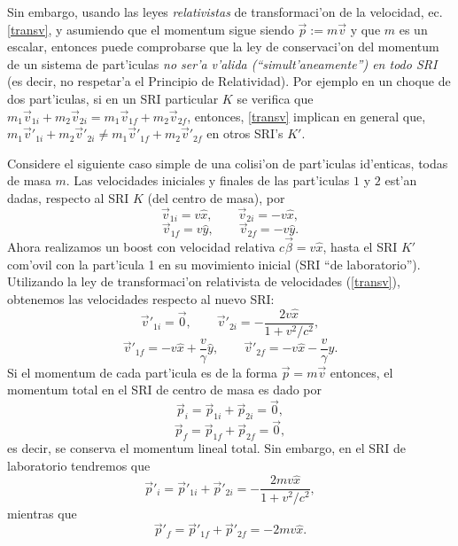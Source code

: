 Sin embargo, usando las leyes \textit{relativistas} de transformaci'on de la velocidad, ec. \eqref{transv}, y asumiendo que el momentum sigue siendo $\vec{p}:=m\vec{v}$ y que $m$ es un escalar, entonces puede comprobarse que la ley de conservaci'on del momentum de un sistema de part'iculas \textit{no ser'a v'alida (``simult'aneamente'') en todo SRI} (es decir, no respetar'a el Principio de Relatividad). Por ejemplo en un choque de dos part'iculas, si en un SRI particular $K$ se verifica que $m_1\vec{v}_{1i}+m_2\vec{v}_{2i} =m_1\vec{v}_{1f}+m_2\vec{v}_{2f}$, entonces, \eqref{transv} implican en general que, $m_1\vec{v}'_{1i}+m_2\vec{v}'_{2i} \neq m_1\vec{v}'_{1f}+m_2\vec{v}'_{2f}$ en otros SRI's $K'$.

Considere el siguiente caso simple de una colisi'on de part'iculas id'enticas, todas de masa $m$.
Las velocidades iniciales y finales de las part'iculas $1$ y $2$ est'an dadas, respecto al SRI $K$ (del centro de masa), por
\begin{equation}
 \vec{v}_{1i}=v \hat{x}, \qquad \vec{v}_{2i}=-v \hat{x},
\end{equation}
\begin{equation}
 \vec{v}_{1f}=v \hat{y}, \qquad \vec{v}_{2f}=-v \hat{y}.
\end{equation}
Ahora realizamos un boost con velocidad relativa $c\vec\beta=v\hat{x}$, hasta el SRI $K'$ com'ovil con la part'icula 1 en su movimiento inicial (SRI ``de laboratorio''). Utilizando la ley de transformaci'on relativista de velocidades (\ref{transv}), obtenemos las velocidades respecto al nuevo SRI:
\begin{equation}
 \vec{v}'_{1i}=\vec{0}, \qquad \vec{v}'_{2i}=-\frac{2v \hat{x}}{1+v^2/c^2},
\end{equation}
\begin{equation}
 \vec{v}'_{1f}=-v\hat{x}+\frac{v}{\gamma} \hat{y}, \qquad \vec{v}'_{2f}=-v\hat{x}-\frac{v}{\gamma} \hat{y}.
\end{equation}
Si el momentum de cada part'icula es de la forma $\vec{p}=m\vec{v}$ entonces, el momentum total en el SRI de centro de masa es dado por
\begin{equation}
 \vec{p}_i=\vec{p}_{1i}+\vec{p}_{2i}=\vec{0},
\end{equation}
\begin{equation}
 \vec{p}_f=\vec{p}_{1f}+\vec{p}_{2f}=\vec{0},
\end{equation}
es decir, se conserva el momentum lineal total. Sin embargo, en el SRI de laboratorio tendremos que
\begin{equation}
 \vec{p}'_i=\vec{p}'_{1i}+\vec{p}'_{2i}=-\frac{2mv\hat{x}}{1+v^2/c^2},
\end{equation}
mientras que
\begin{equation}
 \vec{p}'_f=\vec{p}'_{1f}+\vec{p}'_{2f}=-2mv\hat{x}.
\end{equation}

